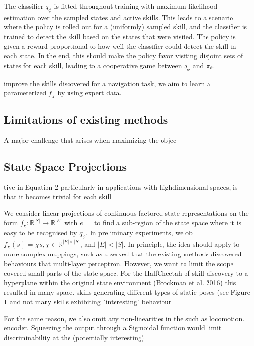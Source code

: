 The classifier $q_{\phi}$ is fitted throughout training with maximum likelihood estimation over the sampled states and active skills. This leads to a scenario where the policy is rolled out for a (uniformly) sampled skill, and the classifier is trained to detect the skill based on the states that were visited. The policy is given a reward proportional to how well the classifier could detect the skill in each state. In the end, this should make the policy favor visiting disjoint sets of states for each skill, leading to a cooperative game between $q_{\phi}$ and $\pi_{\vartheta}$.

improve the skills discovered for a navigation task, we aim to learn a parameterized $f_{\chi}$ by using expert data.

\subsection{Limitations of existing methods}

A major challenge that arises when maximizing the objec-

\subsection{State Space Projections} tive in Equation 2 particularly in applications with highdimensional spaces, is that it becomes trivial for each skill

We consider linear projections of continuous factored state representations on the form $f_{\chi}: \mathbb{R}^{|S|} \rightarrow \mathbb{R}^{|E|}$ with $e=$ to find a sub-region of the state space where it is easy to be recognised by $q_{\phi}$. In preliminary experiments, we ob$f_{\chi}(s)=\chi s, \chi \in \mathbb{R}^{|E| \times|S|}$, and $|E|<|S|$. In principle, the idea should apply to more complex mappings, such as a served that the existing methods discovered behaviours that multi-layer perceptron. However, we want to limit the scope covered small parts of the state space. For the HalfCheetah of skill discovery to a hyperplane within the original state environment (Brockman et al. 2016) this resulted in many space. skills generating different types of static poses (see Figure 1 and not many skills exhibiting "interesting" behaviour

For the same reason, we also omit any non-linearities in the such as locomotion. encoder. Squeezing the output through a Sigmoidal function would limit discriminability at the (potentially interesting)

